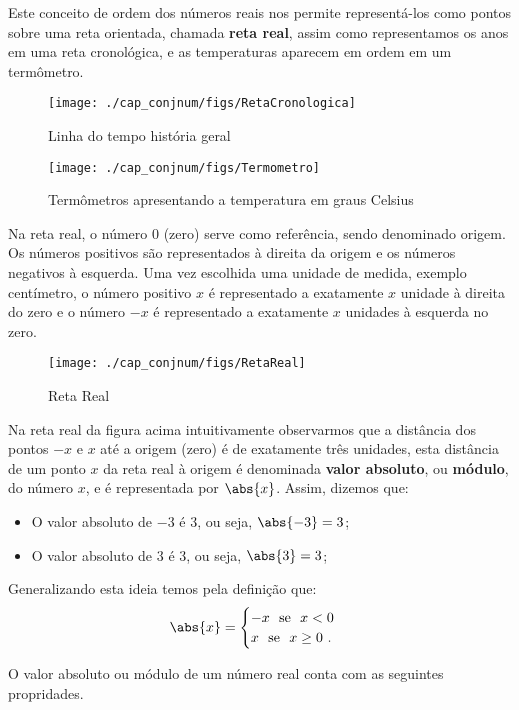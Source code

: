 Este conceito de ordem dos números reais nos permite representá-los como pontos sobre uma reta orientada, chamada \textbf{reta real}, assim como representamos os anos em uma reta cronológica, e as temperaturas aparecem em ordem em um termômetro.

 \begin{figure}[H]
 \centering
 \texttt{[image: ./cap\_conjnum/figs/RetaCronologica]}
 \caption{Linha do tempo história geral}
 \end{figure}

 \begin{figure}[H]
 \centering
 \texttt{[image: ./cap\_conjnum/figs/Termometro]}
 \caption{Termômetros apresentando a temperatura em graus Celsius}
 \end{figure}

 Na reta real, o número $0$ (zero) serve como referência, sendo denominado origem. Os números positivos são representados à direita da origem e os números negativos à esquerda. Uma vez escolhida uma unidade de medida, exemplo centímetro, o número positivo $x$ é representado a exatamente $x$ unidade à direita do zero e o número $-x$ é representado a exatamente $x$ unidades à esquerda no zero.

  \begin{figure}[H]
 \centering
 \texttt{[image: ./cap\_conjnum/figs/RetaReal]}
 \caption{Reta Real}
 \end{figure}

 Na reta real da figura acima intuitivamente observarmos que a distância dos pontos $-x$ e $x$ até a origem (zero) é de exatamente três unidades, esta distância de um ponto $x$ da reta real à origem é denominada \textbf{valor absoluto}, ou \textbf{módulo}, do número $x$, e é representada por $\abs{x}$. Assim, dizemos que:
\begin{itemize}
\item O valor absoluto de $-3$ é $3$, ou seja, $\abs{-3}= 3$;
\item O valor absoluto de $3$ é $3$, ou seja, $\abs{3}= 3$;
\end{itemize}
Generalizando esta ideia temos pela definição que:
\[
\abs{x}= \begin{cases}
      -x \ \ \text{se} \ \ x<0 \\
      x \ \ \text{se} \ \ x \geq 0 \ .
     \end{cases}
\]

O valor absoluto ou módulo de um número real conta com as seguintes propridades.

